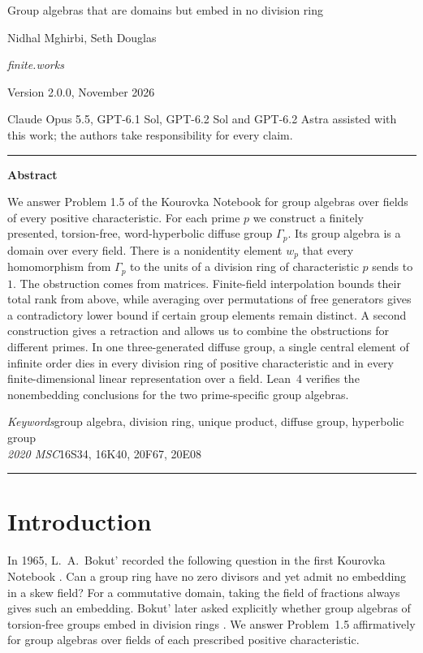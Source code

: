 \documentclass[11pt,a4paper]{article}
\numberwithin{equation}{section}
\begin{document}
\begin{center}
{\Large Group algebras that are domains but embed in no division ring\par}
\vspace{1.35em}
Nidhal Mghirbi, Seth Douglas\par
\vspace{.35em}
{\small\itshape finite.works}
\par\vspace{.35em}
{\small Version 2.0.0, November 2026\par}
\vspace{.6em}
{\small Claude Opus 5.5, GPT-6.1 Sol, GPT-6.2 Sol and GPT-6.2 Astra assisted with this work; the authors take responsibility for every claim.\par}
\end{center}
\vspace{1.5em}
\noindent\rule{\linewidth}{.35pt}

\smallskip\noindent\textbf{Abstract}\par\smallskip
\noindent
We answer Problem 1.5 of the Kourovka Notebook for group algebras over fields of every positive characteristic. For each prime \(p\) we construct a finitely presented, torsion-free, word-hyperbolic diffuse group \(\Gamma_p\). Its group algebra is a domain over every field. There is a nonidentity element \(w_p\) that every homomorphism from \(\Gamma_p\) to the units of a division ring of characteristic \(p\) sends to \(1\). The obstruction comes from matrices. Finite-field interpolation bounds their total rank from above, while averaging over permutations of free generators gives a contradictory lower bound if certain group elements remain distinct. A second construction gives a retraction and allows us to combine the obstructions for different primes. In one three-generated diffuse group, a single central element of infinite order dies in every division ring of positive characteristic and in every finite-dimensional linear representation over a field. Lean~4 verifies the nonembedding conclusions for the two prime-specific group algebras.

\smallskip\noindent\textit{Keywords}\quad group algebra, division ring, unique product, diffuse group, hyperbolic group\\
\textit{2020 MSC}\quad 16S34, 16K40, 20F67, 20E08\par
\noindent\rule{\linewidth}{.35pt}

\section{Introduction}\label{sec:intro}
In 1965, L.~A.~Bokut' recorded the following question in the first Kourovka Notebook \cite[Problem~1.5]{r16}. Can a group ring have no zero divisors and yet admit no embedding in a skew field? For a commutative domain, taking the field of fractions always gives such an embedding. Bokut' later asked explicitly whether group algebras of torsion-free groups embed in division rings \cite[p.~122]{r4}. We answer Problem~1.5 affirmatively for group algebras over fields of each prescribed positive characteristic.
\end{document}
